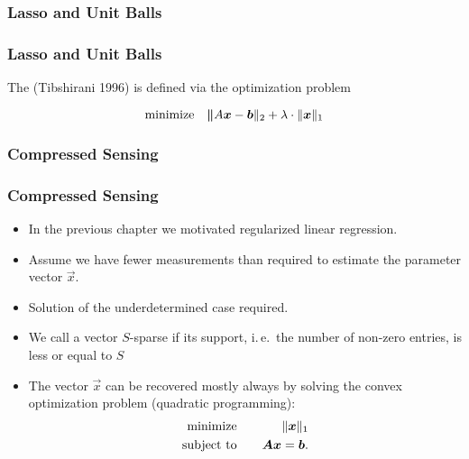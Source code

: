 \subsubsection{Lasso and Unit Balls}

\begin{frame}
  \frametitle{Lasso and Unit Balls}
  
  The  (Tibshirani 1996) is defined via the optimization problem
  
  \begin{displaymath}
    \mbox{minimize} \quad {\bm \|}A{\bm x} -{\bm b}\|_2+\lambda \cdot\|{\bm x}\|_1
  \end{displaymath}

  \begin{center}
  \end{center}
\end{frame}


\subsubsection{Compressed Sensing}

\begin{frame}
  \frametitle{Compressed Sensing}

  \begin{itemize}
    \item In the previous chapter we motivated regularized linear regression. \\[.25cm]
    \item Assume we have fewer measurements than required to estimate the parameter vector $\vec x$. \\[.25cm]
    \item Solution of the underdetermined case required. \\[.25cm]
    \item We call a vector $S$-sparse if its support, i.\,e.\ the number of non-zero entries, is less or equal to $S$  \\[.25cm] \pause
    \item The vector $\vec x$ can be recovered mostly always by solving the convex optimization problem (quadratic programming):
      \begin{eqnarray*}
        \mbox{minimize}   & &\quad \|{\bm x}\|_1\\
        \mbox{subject to} & & \quad {\bm A}{\bm x} ={\bm b}.
      \end{eqnarray*}
  \end{itemize}
\end{frame}


